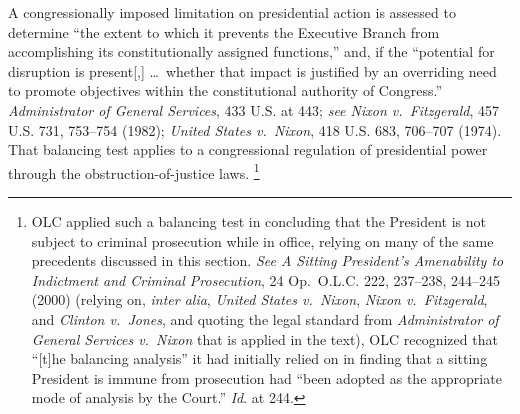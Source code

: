 A congressionally imposed limitation on presidential action is assessed to determine ``the extent to which it prevents the Executive Branch from accomplishing its constitutionally assigned functions,'' and, if the ``potential for disruption is present[,] \dots\ whether that impact is justified by an overriding need to promote objectives within the constitutional authority of Congress.''
\textit{Administrator of General Services}, 433 U.S. at 443;
\textit{see Nixon v.\ Fitzgerald}, 457 U.S. 731, 753--754 (1982);
\textit{United States v.\ Nixon}, 418 U.S. 683, 706--707 (1974).
That balancing test applies to a congressional regulation of presidential power through the obstruction-of-justice laws.%
\footnote{OLC applied such a balancing test in concluding that the President is not subject to criminal prosecution while in office, relying on many of the same precedents discussed in this section.
\textit{See A Sitting President's Amenability to Indictment and Criminal Prosecution}, 24 Op.\ O.L.C. 222, 237--238, 244--245 (2000) (relying on, \textit{inter alia}, \textit{United States v.\ Nixon}, \textit{Nixon v.\ Fitzgerald}, and \textit{Clinton v.\ Jones}, and quoting the legal standard from \textit{Administrator of General Services v.\ Nixon} that is applied in the text), OLC recognized that ``[t]he balancing analysis'' it had initially relied on in finding that a sitting President is immune from prosecution had ``been adopted as the appropriate mode of analysis by the Court.''
\textit{Id}. at 244.}


